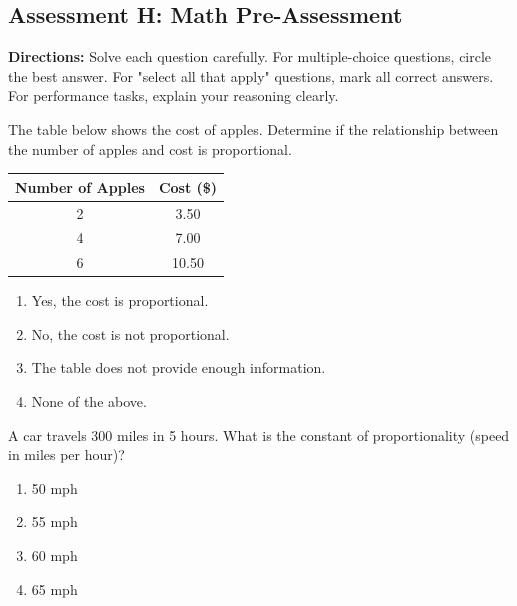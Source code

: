 \documentclass[12pt]{article}
\begin{document}
\subsection*{Assessment H: Math Pre-Assessment}
\onehalfspacing

\begin{tcolorbox}[colframe=black!50, colback=white, title=Assessment Directions]
\textbf{Directions:} Solve each question carefully. For multiple-choice questions, circle the best answer. For "select all that apply" questions, mark all correct answers. For performance tasks, explain your reasoning clearly.
\end{tcolorbox}

\begin{tcolorbox}[colframe=black!50, colback=white, title=\textbf{Problem 1 (7.RP.A.2a)}]
The table below shows the cost of apples. Determine if the relationship between the number of apples and cost is proportional.\\

\begin{center}
\begin{tabular}{|c|c|}
\hline
Number of Apples & Cost (\$) \\
\hline
2 & 3.50 \\
4 & 7.00 \\
6 & 10.50 \\
\hline
\end{tabular}
\end{center}

\begin{enumerate}[label=(\Alph*)]
    \item Yes, the cost is proportional.
    \item No, the cost is not proportional.
    \item The table does not provide enough information.
    \item None of the above.
\end{enumerate}
\end{tcolorbox}

\begin{tcolorbox}[colframe=black!50, colback=white, title=\textbf{Problem 2 (7.RP.A.2b)}]
A car travels 300 miles in 5 hours. What is the constant of proportionality (speed in miles per hour)?

\begin{enumerate}[label=(\Alph*)]
    \item 50 mph
    \item 55 mph
    \item 60 mph
    \item 65 mph
\end{enumerate}
\end{tcolorbox}
\end{document}
